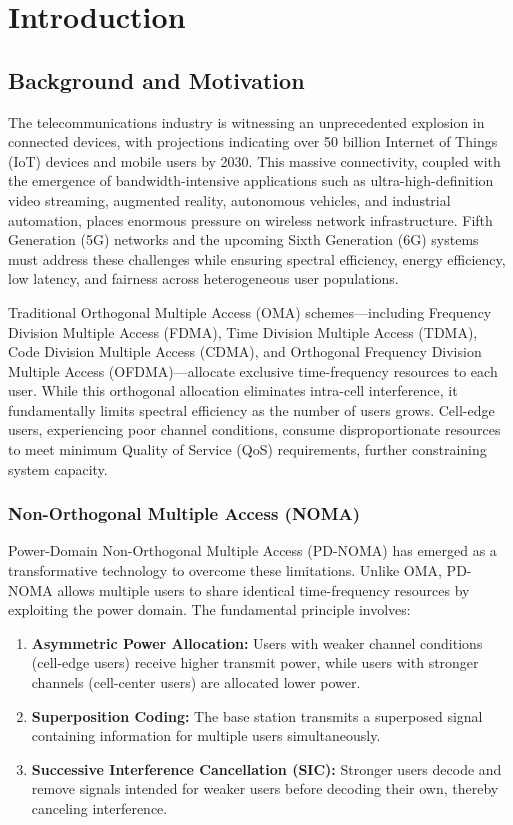 \chapter{Introduction}
\label{chap:introduction}

\section{Background and Motivation}

The telecommunications industry is witnessing an unprecedented explosion in connected devices, with projections indicating over 50 billion Internet of Things (IoT) devices and mobile users by 2030. This massive connectivity, coupled with the emergence of bandwidth-intensive applications such as ultra-high-definition video streaming, augmented reality, autonomous vehicles, and industrial automation, places enormous pressure on wireless network infrastructure. Fifth Generation (5G) networks and the upcoming Sixth Generation (6G) systems must address these challenges while ensuring spectral efficiency, energy efficiency, low latency, and fairness across heterogeneous user populations.

Traditional Orthogonal Multiple Access (OMA) schemes—including Frequency Division Multiple Access (FDMA), Time Division Multiple Access (TDMA), Code Division Multiple Access (CDMA), and Orthogonal Frequency Division Multiple Access (OFDMA)—allocate exclusive time-frequency resources to each user. While this orthogonal allocation eliminates intra-cell interference, it fundamentally limits spectral efficiency as the number of users grows. Cell-edge users, experiencing poor channel conditions, consume disproportionate resources to meet minimum Quality of Service (QoS) requirements, further constraining system capacity.

\subsection{Non-Orthogonal Multiple Access (NOMA)}

Power-Domain Non-Orthogonal Multiple Access (PD-NOMA) has emerged as a transformative technology to overcome these limitations. Unlike OMA, PD-NOMA allows multiple users to share identical time-frequency resources by exploiting the power domain. The fundamental principle involves:

\begin{enumerate}
    \item \textbf{Asymmetric Power Allocation:} Users with weaker channel conditions (cell-edge users) receive higher transmit power, while users with stronger channels (cell-center users) are allocated lower power.
    
    \item \textbf{Superposition Coding:} The base station transmits a superposed signal containing information for multiple users simultaneously.
    
    \item \textbf{Successive Interference Cancellation (SIC):} Stronger users decode and remove signals intended for weaker users before decoding their own, thereby canceling interference.
\end{enumerate}


